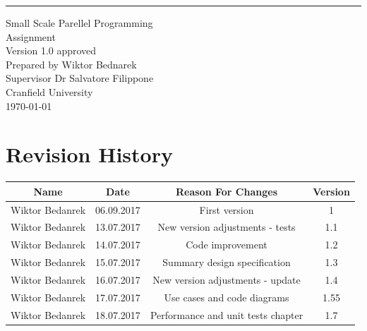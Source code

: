 \documentclass{scrreprt}
\date{}
\def\myversion{1.0 }
\begin{document}
\begin{flushright}
    \rule{16cm}{5pt}\vskip1cm
    \begin{bfseries}
        \Huge{Small Scale Parellel Programming\\ Assignment}\\
       
        \vspace{1.9cm}
        \LARGE{Version \myversion approved}\\
        \vspace{1.9cm}
        Prepared by Wiktor Bednarek\\
        \vspace{1.9cm}
        Supervisor Dr Salvatore Filippone \\
        \vspace{1.9cm}
        Cranfield University\\
        \vspace{1.9cm}
        \today\\
    \end{bfseries}
\end{flushright}

\tableofcontents


\chapter*{Revision History}

\begin{center}
    \begin{tabular}{|c|c|c|c|}
        \hline
	    Name & Date & Reason For Changes & Version\\
        \hline
	    Wiktor Bedanrek & 06.09.2017 & First version & 1\\
        \hline
	    Wiktor Bedanrek & 13.07.2017 & New version adjustments - tests & 1.1\\
        \hline
         Wiktor Bedanrek & 14.07.2017 & Code improvement& 1.2\\
        \hline
         Wiktor Bedanrek & 15.07.2017 & Summary design specification& 1.3\\
        \hline
         Wiktor Bedanrek & 16.07.2017 & New version adjustments - update& 1.4\\
        \hline
          Wiktor Bedanrek & 17.07.2017 & Use cases and code diagrams& 1.55\\
        \hline
          Wiktor Bedanrek & 18.07.2017 & Performance and unit tests chapter& 1.7\\
        \hline
    \end{tabular}
\end{center}
\end{document}
